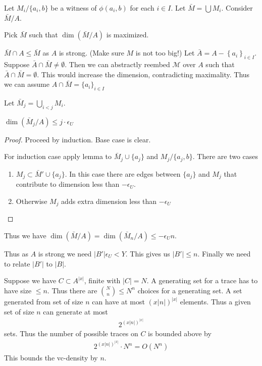 \documentclass{amsart}
\newcommand{\M}{\mathcal M}
\newcommand{\curly}[1]{\left\{#1\right\}}
\begin{document}
Let $M_i / \{a_i, b\}$ be a witness of $\phi(a_i, b)$ for each $i \in I$.
Let $\bar M = \bigcup M_i$.
Consider $\bar M / A$.

Pick $\bar M$ such that $\dim(\bar M / A)$ is maximized.

$\bar M \cap A \leq \bar M$ as $A$ is strong. (Make sure $M$ is not too big!)
Let $\bar A = A - \curly{a_i}_{i \in I}$.
Suppose $\bar A \cap \bar M \neq \emptyset$.
Then we can abstractly reembed $\M$ over $A$ such that $\bar A \cap \bar M = \emptyset$.
This would increase the dimension, contradicting maximality.
Thus we can assume $A \cap \bar M = \{a_i\}_{i \in I}$

Let $\bar M_j = \bigcup_{i < j} M_i$.

\begin{Lemma}
	$\dim(\bar M_j / A) \leq j \cdot \epsilon_U$
\end{Lemma}
\begin{proof}
	Proceed by induction.
	Base case is clear.

	For induction case apply lemma to $\bar M_j \cup \{a_j\}$ and $M_j / \{a_j, b\}$.
	There are two cases
	\begin{enumerate}
		\item $M_j \subset \bar M' \cup \{a_j\}$.
		In this case there are edges between $\{a_j\}$ and $M_j$ that contribute to dimension less than $-\epsilon_U$.
		\item Otherwise $M_j$ adds extra dimension less than $-\epsilon_U$
	\end{enumerate}
\end{proof}

Thus we have $\dim(\bar M / A) = \dim(\bar M_n / A) \leq -\epsilon_U n$.

Thus as $A$ is strong we need $|B'| \epsilon_U < Y$.
This gives us $|B'| \leq n$.
Finally we need to relate $|B'|$ to $|B|$.

Suppose we have $C \subset A^{|x|}$, finite with $|C| = N$.
A generating set for a trace has to have size $\leq n$.
Thus there are ${N \choose n} \leq N^n$ choices for a generating set.
A set generated from set of size $n$ can have at most $(x|n|)^{|x|}$ elements.
Thus a given set of size $n$ can generate at most
\begin{align*}
	2^{(x|n|)^{|x|}}
\end{align*}
sets.
Thus the number of possible traces on $C$ is bounded above by
\begin{align*}
  2^{(x|n|)^{|x|}} \cdot N^n = O(N^n)
\end{align*}
This bounds the vc-density by $n$.
\end{document}
